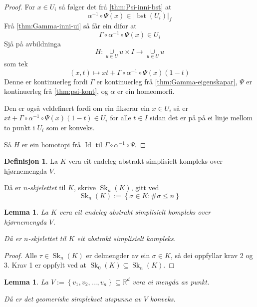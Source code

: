 \documentclass[a4paper, 12pt, norsk]{article}
\theoremstyle{plain}
\newtheorem{lemma}[theorem]{Lemma}
\theoremstyle{definition}
\newtheorem{definition}[theorem]{Definisjon}
\newcommand{\Rb}{\mathbb{R}}
\newcommand{\union}{ \mathop{\cup}\limits }
\newcommand{\gr}[1]{ \lvert #1 \rvert } %
\newcommand{\set}[1]{ \left\{ #1 \right\} } %
\newcommand{\tuple}[1]{ \left( #1 \right) } %
\DeclareMathOperator{\bst}{bst} %
\DeclareMathOperator{\Sk}{Sk} %
\DeclareMathOperator{\Id}{Id} %
\begin{document}
\begin{proof}
	For \( x \in U_i \) så følger det frå \autoref{thm:Psi-inni-bst} at
	\[
		\alpha^{-1} \circ \Psi(x) \in \gr{\bst(U_i)}_f
	\]
	Frå \autoref{thm:Gamma-inni-ui} så får ein difor at
	\[
		\Gamma \circ \alpha^{-1} \circ \Psi(x) \in U_i
	\]
	Sjå på avbildninga
	\[
		H: \union_{u \in U} u \times I \to \union_{u \in U} u
	\]
	som tek
	\[
		\tuple{x, t} \mapsto xt + \Gamma \circ \alpha^{-1} \circ \Psi(x)(1-t)
	\]
	Denne er kontinuerleg fordi \( \Gamma \) er kontinuerleg frå \autoref{thm:Gamma-eigenskapar}, \( \Psi \) er kontinuerleg frå \autoref{thm:psi-kont}, og \( \alpha \) er ein homeomorfi.
	
	Den er også veldefinert fordi om ein fikserar ein \( x \in U_i \) så er \( xt + \Gamma \circ \alpha^{-1} \circ \Psi(x)(1-t) \in U_i \) for alle \( t \in I \) sidan det er på på ei linje mellom to punkt i \( U_i \) som er konveks.

	Så \( H \) er ein homotopi frå \( \Id \) til \( \Gamma \circ \alpha^{-1} \circ \Psi \).
\end{proof}

\begin{definition}
	La \( K \) vera eit endeleg abstrakt simplisielt kompleks over hjørnemengda \( V \). 
	
	Då er \emph{\( n \)-skjelettet} til \( K \), skrive \( \Sk_n(K) \), gitt ved
	\[
		\Sk_n(K) := \set{\sigma \in K : \#\sigma \leq n}
	\]
\end{definition}

\begin{lemma}
	La \( K \) vera eit endeleg abstrakt simplisielt kompleks over hjørnemengda \( V \). 
	
	Då er \( n \)-skjelettet til \( K \) eit abstrakt simplisielt kompleks.
\end{lemma}

\begin{proof}
	Alle \( \tau \in \Sk_n(K) \) er delmengder av ein \( \sigma \in K \), så dei oppfyllar krav 2 og 3. Krav 1 er oppfylt ved at \( \Sk_0(K) \subseteq \Sk_n(K) \).
\end{proof}

\begin{lemma} \label{thm:konveks-kombinasjon-er-konveks}
	La \( V := \set{v_1, v_2, \dots, v_n} \subseteq \Rb^d \) vera ei mengda av punkt.
	
	Då er det geomeriske simplekset utspunne av \( V \) konveks.
\end{lemma}
\end{document}
